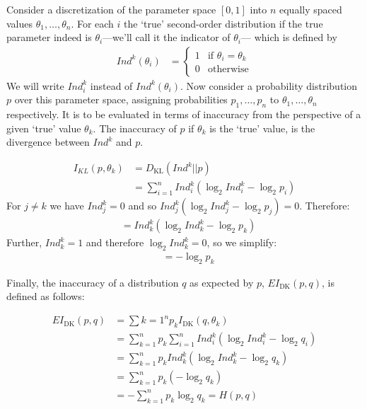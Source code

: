 \documentclass[
  letterpaper,
  DIV=11,
  numbers=noendperiod]{scrartcl}
\begin{document}
Consider a discretization of the parameter space \([0,1]\) into \(n\)
equally spaced values \(\theta_1, \dots, \theta_n\). For each \(i\) the
`true' second-order distribution if the true parameter indeed is
\(\theta_i\)---we'll call it the indicator of \(\theta_i\)--- which is
defined by \begin{align*}
Ind^k(\theta_i) & = \begin{cases} 1 & \mbox{if } \theta_i = \theta_k\\
                        0 & \mbox{otherwise}  \end{cases}
\end{align*} \noindent We will write \(Ind^k_i\) instead of
\(Ind^k(\theta_i)\). Now consider a probability distribution \(p\) over
this parameter space, assigning probabilities \(p_1, \dots, p_n\) to
\(\theta_1, \dots, \theta_n\) respectively. It is to be evaluated in
terms of inaccuracy from the perspective of a given `true' value
\(\theta_k\). The inaccuracy of \(p\) if \(\theta_k\) is the `true'
value, is the divergence between \(Ind^k\) and \(p\).

\begin{align*}
I_{KL}(p, \theta_k) & = D_\text{KL}(Ind^k||p) \\
& = \sum_{i=1}^n Ind^k_i \left( \log_2 Ind^k_i - \log_2 p_i \right)
\end{align*} For \(j \neq k\) we have \(Ind^k_j = 0\) and so
\(Ind^k_j \left( \log_2 Ind^k_j - \log_2 p_j \right)=0\). Therefore:
\begin{align*}
& = Ind^k_k \left( \log_2 Ind^k_k - \log_2 p_k \right)
\end{align*} Further, \(Ind^k_k= 1\) and therefore
\(\log_2 Ind^k_k =0\), so we simplify: \begin{align*}
& =  - \log_2 p_k
\end{align*}

\noindent Finally, the inaccuracy of a distribution \(q\) as expected by
\(p\), \(\mathit{EI}_{\text{DK}}(p,q)\), is defined as follows:

\begin{align*}
\mathit{EI}_{\text{DK}}(p,q) & = \sum{k =1}^n p_k I_{\text{DK}}(q, \theta_k) \\
& = \sum_{k =1}^n p_k \sum_{i=1}^n Ind^k_i \left( \log_2 Ind^k_i - \log_2 q_i \right)\\
& = \sum_{k =1}^n p_k Ind^k_k \left( \log_2 Ind^k_k - \log_2 q_k \right)\\
& = \sum_{k =1}^n p_k ( - \log_2 q_k) \\
& = - \sum_{k =1}^n p_k \log_2 q_k = H(p,q)\\
\end{align*}
\end{document}

